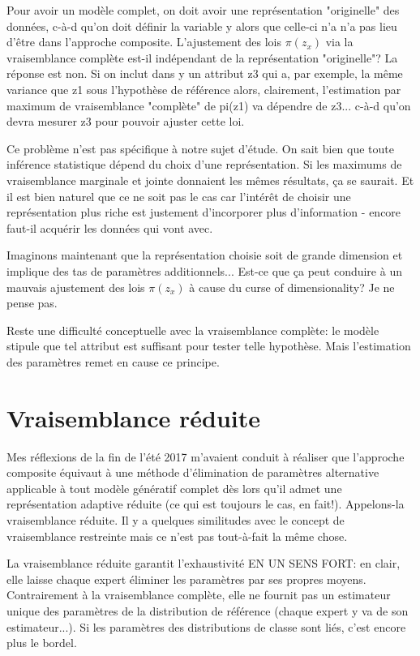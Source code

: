 \documentclass{article}
\begin{document}
Pour avoir un mod\`ele complet, on doit avoir une repr\'esentation "originelle" des donn\'ees, c-\`a-d qu'on doit d\'efinir la variable y alors que celle-ci n'a n'a pas lieu d'\^etre dans l'approche composite. L'ajustement des lois $\pi(z_x)$ via la vraisemblance compl\`ete est-il ind\'ependant de la repr\'esentation "originelle"? La r\'eponse est non. Si on inclut dans y un attribut z3 qui a, par exemple, la m\^eme variance que z1 sous l'hypoth\`ese de r\'ef\'erence alors, clairement, l'estimation par maximum de vraisemblance "compl\`ete" de pi(z1) va d\'ependre de z3... c-\`a-d qu'on devra mesurer z3 pour pouvoir ajuster cette loi. 

Ce probl\`eme n'est pas sp\'ecifique \`a notre sujet d'\'etude. On sait bien que toute inf\'erence statistique d\'epend du choix d'une repr\'esentation. Si les maximums de vraisemblance marginale et jointe donnaient les m\^emes r\'esultats, \c{c}a se saurait. Et il est bien naturel que ce ne soit pas le cas car l'int\'er\^et de choisir une repr\'esentation plus riche est justement d'incorporer plus d'information - encore faut-il acqu\'erir les donn\'ees qui vont avec. 

Imaginons maintenant que la repr\'esentation choisie soit de grande dimension et implique des tas de param\`etres additionnels... Est-ce que \c{c}a peut conduire \`a un mauvais ajustement des lois $\pi(z_x)$ \`a cause du curse of dimensionality? Je ne pense pas. 

Reste une difficult\'e conceptuelle avec la vraisemblance compl\`ete: le mod\`ele stipule que tel attribut est suffisant pour tester telle hypoth\`ese. Mais l'estimation des param\`etres remet en cause ce principe. 


\section{Vraisemblance r\'eduite}

Mes r\'eflexions de la fin de l'\'et\'e 2017 m'avaient conduit \`a r\'ealiser que l'approche composite \'equivaut \`a une m\'ethode d'\'elimination de param\`etres alternative applicable \`a tout mod\`ele g\'en\'eratif complet d\`es lors qu'il admet une repr\'esentation adaptive r\'eduite (ce qui est toujours le cas, en fait!). Appelons-la vraisemblance r\'eduite. Il y a quelques similitudes avec le concept de vraisemblance restreinte mais ce n'est pas tout-\`a-fait la m\^eme chose. 

La vraisemblance r\'eduite garantit l'exhaustivit\'e EN UN SENS FORT: en clair, elle laisse chaque expert \'eliminer les param\`etres par ses propres moyens. Contrairement \`a la vraisemblance compl\`ete, elle ne fournit pas un estimateur unique des param\`etres de la distribution de r\'ef\'erence (chaque expert y va de son estimateur...). Si les param\`etres des distributions de classe sont li\'es, c'est encore plus le bordel. 
\end{document}
